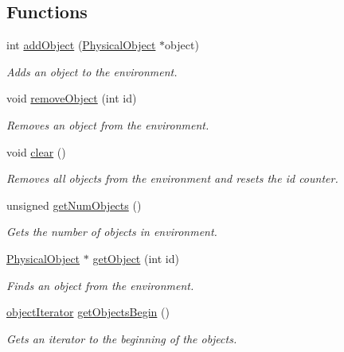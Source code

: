 \subsection*{Functions}
\begin{DoxyCompactItemize}
\item 
int \hyperlink{namespaceenvironment_ae9ecf3e6b007d1c73cf18594d659b255}{add\-Object} (\hyperlink{classPhysicalObject}{Physical\-Object} $\ast$object)
\begin{DoxyCompactList}\small\item\em Adds an object to the environment. \end{DoxyCompactList}\item 
void \hyperlink{namespaceenvironment_a26801958350a15098c590192c8dcd751}{remove\-Object} (int id)
\begin{DoxyCompactList}\small\item\em Removes an object from the environment. \end{DoxyCompactList}\item 
void \hyperlink{namespaceenvironment_a883864c5c3c7f8ca4954781dae04bc11}{clear} ()
\begin{DoxyCompactList}\small\item\em Removes all objects from the environment and resets the id counter. \end{DoxyCompactList}\item 
unsigned \hyperlink{namespaceenvironment_a450984ea6790ba4e65e004133fb26c9c}{get\-Num\-Objects} ()
\begin{DoxyCompactList}\small\item\em Gets the number of objects in environment. \end{DoxyCompactList}\item 
\hyperlink{classPhysicalObject}{Physical\-Object} $\ast$ \hyperlink{namespaceenvironment_a63ac0eb5daa2876cd17cacf3b86d732b}{get\-Object} (int id)
\begin{DoxyCompactList}\small\item\em Finds an object from the environment. \end{DoxyCompactList}\item 
\hyperlink{namespaceenvironment_a3a7a388d4b4ceb0a34bf0c72579780e1}{object\-Iterator} \hyperlink{namespaceenvironment_a8ae4deeff543f98dc5293b3949698dba}{get\-Objects\-Begin} ()
\begin{DoxyCompactList}\small\item\em Gets an iterator to the beginning of the objects. \end{DoxyCompactList}\item 

\end{DoxyCompactItemize}
